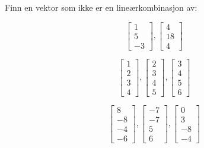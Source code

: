\begin{oppgave}
Finn en vektor som ikke er en lineærkombinasjon av:
\begin{punkt}
	$$
	\begin{bmatrix}
	1\\
	5\\
	-3
	\end{bmatrix},
	\begin{bmatrix}
	4\\
	18\\
	4
	\end{bmatrix}
	$$
\end{punkt}

\begin{punkt}
$$
\begin{bmatrix}
1\\
2\\
3\\
4
\end{bmatrix},
\begin{bmatrix}
2\\
3\\
4\\
5
\end{bmatrix},
\begin{bmatrix}
3\\
4\\
5\\
6
\end{bmatrix}
$$
\end{punkt}

\begin{punkt}
	$$
	\begin{bmatrix}
	8  \\
	-8 \\
	-4 \\
	-6
	\end{bmatrix},
	\begin{bmatrix}
	-7  \\
	-7 \\
	5 \\
	6
	\end{bmatrix},
	\begin{bmatrix}
	0  \\
	3 \\
	-8 \\
	-4
	\end{bmatrix}
	$$
\end{punkt}

\end{oppgave}

